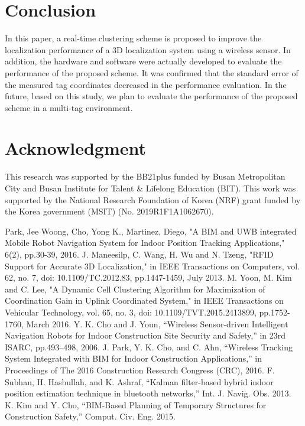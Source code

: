 \documentclass[conference]{IEEEtran}
\begin{document}
\section{Conclusion}

In this paper, a real-time clustering scheme is proposed to improve the localization performance of a 3D localization system using a wireless sensor. In addition, the hardware and software were actually developed to evaluate the performance of the proposed scheme. It was confirmed that the standard error of the measured tag coordinates decreased in the performance evaluation. In the future, based on this study, we plan to evaluate the performance of the proposed scheme in a multi-tag environment.

\section*{Acknowledgment}

This research was supported by the BB21plus funded by Busan Metropolitan City and Busan Institute for Talent \& Lifelong Education (BIT).
This work was supported by the National Research Foundation of Korea (NRF) grant funded by the Korea government (MSIT) (No. 2019R1F1A1062670).

\begin{thebibliography}{00}
 Park, Jee Woong, Cho, Yong K., Martinez, Diego, "A BIM and UWB integrated Mobile Robot Navigation System for Indoor Position Tracking Applications," 6(2), pp.30-39, 2016.
 J. Maneesilp, C. Wang, H. Wu and N. Tzeng, "RFID Support for Accurate 3D Localization," in IEEE Transactions on Computers, vol. 62, no. 7, doi: 10.1109/TC.2012.83, pp.1447-1459, July 2013.
 M. Yoon, M. Kim and C. Lee, "A Dynamic Cell Clustering Algorithm for Maximization of Coordination Gain in Uplink Coordinated System," in IEEE Transactions on Vehicular Technology, vol. 65, no. 3, doi: 10.1109/TVT.2015.2413899, pp.1752-1760, March 2016.
 Y. K. Cho and J. Youn, “Wireless Sensor-driven Intelligent Navigation Robots for Indoor Construction Site Security and Safety,” in 23rd ISARC, pp.493–498, 2006.
 J. Park, Y. K. Cho, and C. Ahn, “Wireless Tracking System Integrated with BIM for Indoor Construction Applications,” in Proceedings of The 2016 Construction Research Congress (CRC), 2016.
 F. Subhan, H. Hasbullah, and K. Ashraf, “Kalman filter-based hybrid indoor position estimation technique in bluetooth networks,” Int. J. Navig. Obs. 2013.
 K. Kim and Y. Cho, “BIM-Based Planning of Temporary Structures for Construction Safety,” Comput. Civ. Eng. 2015.

\end{thebibliography}
\end{document}
